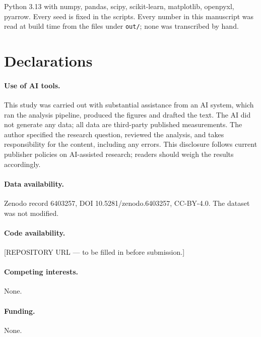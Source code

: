 \documentclass[11pt]{article}
\begin{document}
Python 3.13 with numpy, pandas, scipy, scikit-learn, matplotlib, openpyxl, pyarrow. Every seed is fixed in the scripts. Every number in this manuscript was read at build time from the files under \texttt{out/}; none was transcribed by hand.

\section*{Declarations}

\paragraph{Use of AI tools.} This study was carried out with substantial assistance from an AI system, which ran the analysis pipeline, produced the figures and drafted the text. The AI did not generate any data; all data are third-party published measurements. The author specified the research question, reviewed the analysis, and takes responsibility for the content, including any errors. This disclosure follows current publisher policies on AI-assisted research; readers should weigh the results accordingly.

\paragraph{Data availability.} Zenodo record 6403257, DOI 10.5281/zenodo.6403257, CC-BY-4.0. The dataset was not modified.

\paragraph{Code availability.} [REPOSITORY URL --- to be filled in before submission.]

\paragraph{Competing interests.} None.

\paragraph{Funding.} None.
\end{document}
